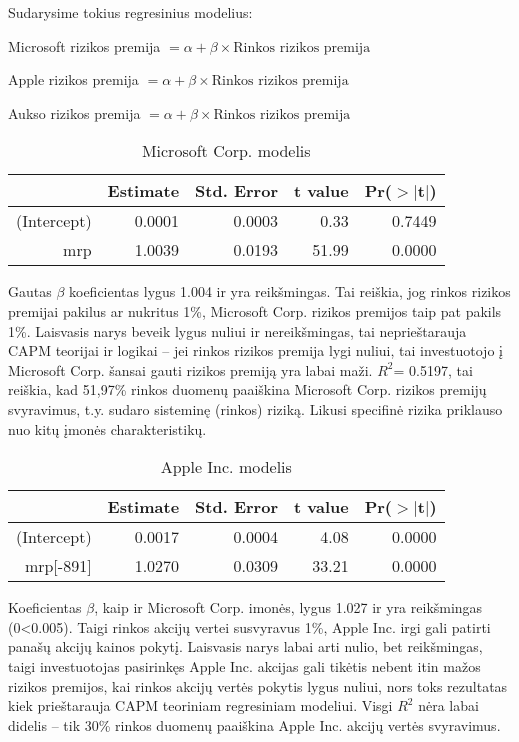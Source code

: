\documentclass[12pt, a14paper, lithuanian]{article}
\begin{document}
Sudarysime tokius regresinius modelius:

Microsoft rizikos premija $= \alpha + \beta \times  \text {Rinkos rizikos premija}$

Apple rizikos premija $= \alpha + \beta \times  \text {Rinkos rizikos premija}$

Aukso rizikos premija $= \alpha + \beta \times \text {Rinkos rizikos premija}$



\begin{table}[ht]
\begin{center}
\begin{tabular}{rrrrr}
  \hline
 & Estimate & Std. Error & t value & Pr($>$$|$t$|$) \\ 
  \hline
(Intercept) & 0.0001 & 0.0003 & 0.33 & 0.7449 \\ 
  mrp & 1.0039 & 0.0193 & 51.99 & 0.0000 \\ 
   \hline
\end{tabular}
\end{center}
\caption{Microsoft Corp. modelis}
\end{table}

Gautas $\beta$ koeficientas lygus 1.004 ir yra reikšmingas. Tai reiškia, jog rinkos rizikos premijai pakilus ar nukritus 1\%, Microsoft Corp. rizikos premijos taip pat pakils 1\%. Laisvasis narys beveik lygus nuliui ir nereikšmingas,
tai neprieštarauja CAPM teorijai ir logikai -- jei rinkos rizikos premija lygi nuliui, tai investuotojo į Microsoft Corp. šansai gauti rizikos premiją yra labai maži.
$R^2$= 0.5197, tai reiškia, kad 51,97\% rinkos duomenų paaiškina Microsoft Corp. rizikos premijų svyravimus, t.y. sudaro sisteminę (rinkos) riziką. Likusi specifinė rizika priklauso nuo kitų įmonės charakteristikų.

\begin{table}[ht]
\begin{center}
\begin{tabular}{rrrrr}
  \hline
 & Estimate & Std. Error & t value & Pr($>$$|$t$|$) \\ 
  \hline
(Intercept) & 0.0017 & 0.0004 & 4.08 & 0.0000 \\ 
  mrp[-891] & 1.0270 & 0.0309 & 33.21 & 0.0000 \\ 
   \hline
\end{tabular}
\end{center}
\caption{Apple Inc. modelis}
\end{table}

Koeficientas $\beta$, kaip ir Microsoft Corp. imonės, lygus 1.027 ir yra reikšmingas (0<0.005). Taigi rinkos akcijų vertei susvyravus 1\%, Apple
Inc. irgi gali patirti panašų akcijų kainos pokytį. Laisvasis narys labai arti nulio, bet reikšmingas,
taigi investuotojas pasirinkęs Apple Inc. akcijas gali tikėtis nebent itin mažos rizikos premijos, kai rinkos akcijų vertės
pokytis lygus nuliui, nors toks rezultatas kiek prieštarauja CAPM teoriniam regresiniam modeliui.
Visgi  $R^2$ nėra labai didelis -- tik 30\% rinkos duomenų paaiškina Apple Inc. akcijų vertės svyravimus.
\end{document}
